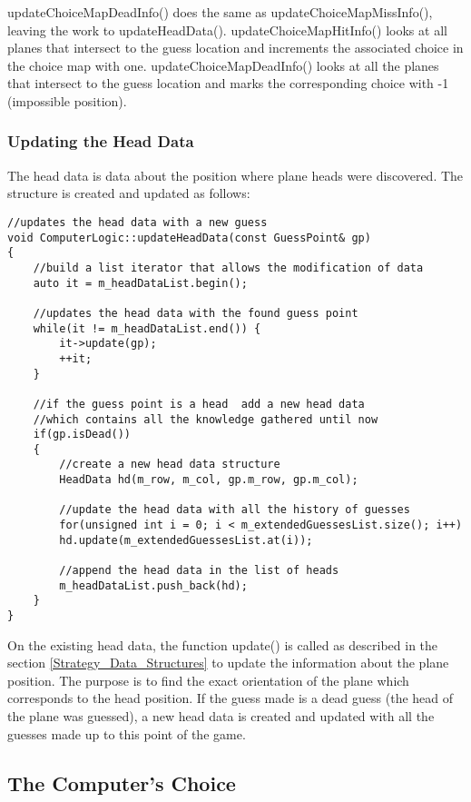 updateChoiceMapDeadInfo() does the same as updateChoiceMapMissInfo(), leaving the work to updateHeadData(). updateChoiceMapHitInfo() looks at all planes that intersect to the guess location and increments the associated choice in the choice map with one. updateChoiceMapDeadInfo() looks at all the planes that intersect to the guess location and marks the corresponding choice with -1 (impossible position).

\subsubsection {Updating the Head Data}

The head data is data about the position where plane heads were discovered. The structure is created and updated as follows:

\begin{lstlisting}
//updates the head data with a new guess
void ComputerLogic::updateHeadData(const GuessPoint& gp)
{
	//build a list iterator that allows the modification of data
	auto it = m_headDataList.begin();
	
	//updates the head data with the found guess point
	while(it != m_headDataList.end()) {
		it->update(gp);
		++it;
	}
	
	//if the guess point is a head  add a new head data
	//which contains all the knowledge gathered until now
	if(gp.isDead())
	{
		//create a new head data structure
		HeadData hd(m_row, m_col, gp.m_row, gp.m_col);
		
		//update the head data with all the history of guesses
		for(unsigned int i = 0; i < m_extendedGuessesList.size(); i++)
		hd.update(m_extendedGuessesList.at(i));
		
		//append the head data in the list of heads
		m_headDataList.push_back(hd);
	}
}
\end{lstlisting}

On the existing head data, the function update() is called as described in the section \ref{Strategy_Data_Structures} to update the information about the plane position. The purpose is to find the exact orientation of the plane which corresponds to the head position. If the guess made is a dead guess (the head of the plane was guessed), a new head data is created and updated with all the guesses made up to this point of the game.


\subsection {The Computer's Choice}


